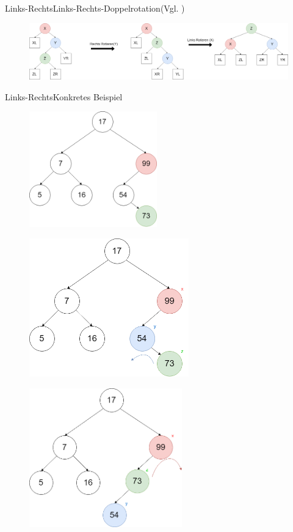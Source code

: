 \begin{frame}{Links-Rechts}{Links-Rechts-Doppelrotation(Vgl. \cite{avltree})}
\begin{figure}
	\centering
	\includegraphics[width=\textwidth]{graph/avl_insert_rl}
\end{figure}
\end{frame}

\begin{frame}[allowframebreaks]{Links-Rechts}{Konkretes Beispiel}
\begin{figure}[ht!]
	\centering
	\includegraphics[height=5cm]{graph/avl_insert_lr_1}
\end{figure}
\framebreak
\begin{figure}
	\centering
	\includegraphics[height=6cm]{graph/avl_insert_lr_2}
\end{figure}
\framebreak
\begin{figure}
	\centering
	\includegraphics[height=6cm]{graph/avl_insert_lr_3}

\end{figure}
\end{frame}

